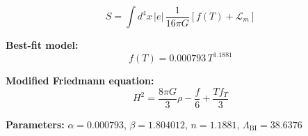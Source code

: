
\begin{equation}
  S = \int d^4x \, |e| \, \frac{1}{16\pi G} \left[ f(T) + \mathcal{L}_m \right]
\end{equation}

\textbf{Best-fit model:}
\begin{equation}
  f(T) = 0.000793 \, T^{1.1881}
\end{equation}

\textbf{Modified Friedmann equation:}
\begin{equation}
  H^2 = \frac{8\pi G}{3} \rho - \frac{f}{6} + \frac{T f_T}{3}
\end{equation}

\textbf{Parameters:}
$\alpha = 0.000793$, \quad
$\beta = 1.804012$, \quad
$n = 1.1881$, \quad
$\Lambda_{\text{BI}} = 38.6376$